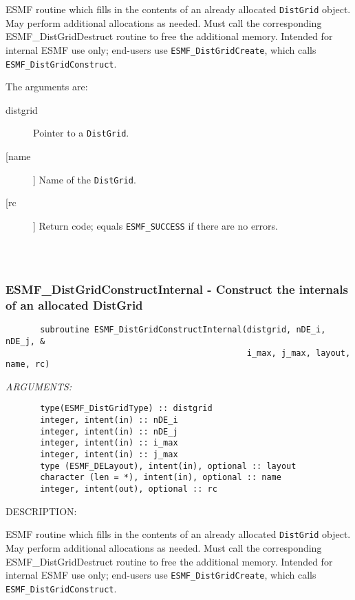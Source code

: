        ESMF routine which fills in the contents of an already
       allocated {\tt DistGrid} object.  May perform additional allocations
       as needed.  Must call the corresponding ESMF\_DistGridDestruct
       routine to free the additional memory.  Intended for internal
       ESMF use only; end-users use {\tt ESMF\_DistGridCreate}, which calls
       {\tt ESMF\_DistGridConstruct}. 
  
       The arguments are:
       \begin{description}
       \item[distgrid] 
            Pointer to a {\tt DistGrid}.
       \item[[name]] 
            Name of the {\tt DistGrid}.
       \item[[rc]] 
            Return code; equals {\tt ESMF\_SUCCESS} if there are no errors.
       \end{description}
  
\begin{verbatim} \end{verbatim}
 
 
\mbox{}\hrulefill\ 
 
\subsubsection{ESMF\_DistGridConstructInternal - Construct the internals of an allocated DistGrid}


\begin{verbatim}       subroutine ESMF_DistGridConstructInternal(distgrid, nDE_i, nDE_j, &
                                                 i_max, j_max, layout, name, rc)\end{verbatim}{\em ARGUMENTS:}
\begin{verbatim}       type(ESMF_DistGridType) :: distgrid 
       integer, intent(in) :: nDE_i
       integer, intent(in) :: nDE_j
       integer, intent(in) :: i_max
       integer, intent(in) :: j_max
       type (ESMF_DELayout), intent(in), optional :: layout
       character (len = *), intent(in), optional :: name  
       integer, intent(out), optional :: rc               \end{verbatim}
{\sf DESCRIPTION:\\ }


       ESMF routine which fills in the contents of an already
       allocated {\tt DistGrid} object.  May perform additional allocations
       as needed.  Must call the corresponding ESMF\_DistGridDestruct
       routine to free the additional memory.  Intended for internal
       ESMF use only; end-users use {\tt ESMF\_DistGridCreate}, which calls
       {\tt ESMF\_DistGridConstruct}. 
  
